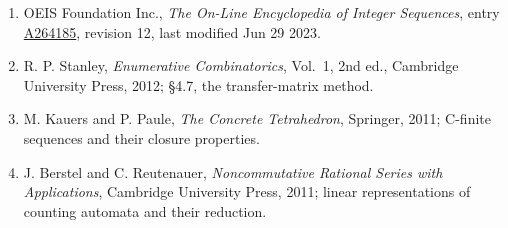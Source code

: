 \documentclass[11pt]{article}
\theoremstyle{definition}
\begin{document}
\begin{enumerate}

\item OEIS Foundation Inc., \emph{The On-Line Encyclopedia of Integer Sequences}, entry \href{https://oeis.org/A264185}{A264185}, revision 12, last modified Jun 29 2023.

\item R. P. Stanley, \emph{Enumerative Combinatorics}, Vol.~1, 2nd ed., Cambridge University Press, 2012; \S4.7, the transfer-matrix method.

\item M. Kauers and P. Paule, \emph{The Concrete Tetrahedron}, Springer, 2011; C-finite sequences and their closure properties.

\item J. Berstel and C. Reutenauer, \emph{Noncommutative Rational Series with Applications}, Cambridge University Press, 2011; linear representations of counting automata and their reduction.

\end{enumerate}
\end{document}
